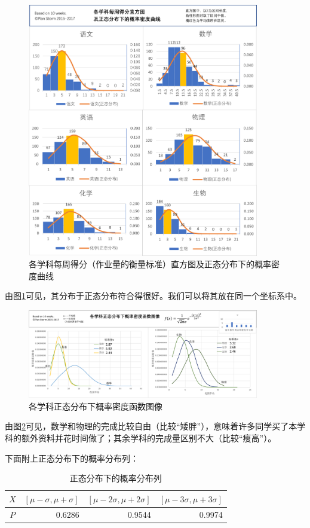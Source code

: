 \documentclass[a4paper,12pt]{article}
\begin{document}
\begin{CJK}{UTF8}{song}
\begin{figure}[H]
    \centering
    \includegraphics[width=0.9\textwidth]{img/4.png}
    \caption{各学科每周得分（作业量的衡量标准）直方图及正态分布下的概率密度曲线}
    \label{subject}
\end{figure}

由图\ref{subject}可见，其分布于正态分布符合得很好。我们可以将其放在同一个坐标系中。

\begin{figure}[H]
    \centering
    \includegraphics[width=0.9\textwidth]{img/5.png}
    \caption{各学科正态分布下概率密度函数图像}
    \label{var}
\end{figure}

由图\ref{var}可见，数学和物理的完成比较自由（比较“矮胖”），意味着许多同学买了本学科的额外资料并花时间做了；其余学科的完成量区别不大（比较“瘦高”）。

下面附上正态分布下的概率分布列：
\begin{table}[H]
    \centering
    \caption{正态分布下的概率分布列}
    \begin{tabular}{c|rrr}
        $X$ & $[\mu-\sigma,\mu+\sigma]$ & $[\mu-2\sigma,\mu+2\sigma]$ & $[\mu-3\sigma,\mu+3\sigma]$ \\
        \hline
        $P$ & 0.6286 & 0.9544 & 0.9974 \\
    \end{tabular}
\end{table}


\end{CJK}
\end{document}
